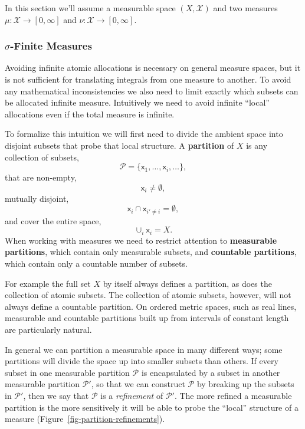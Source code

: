 \documentclass[
  letterpaper,
  DIV=11,
  numbers=noendperiod]{scrartcl}
\begin{document}
In this section we'll assume a measurable space \((X, \mathcal{X})\) and
two measures \(\mu : \mathcal{X} \rightarrow [0, \infty]\) and
\(\nu : \mathcal{X} \rightarrow [0, \infty]\).

\hypertarget{sigma-finite-measures}{%
\subsubsection{\texorpdfstring{{\(\sigma\)}-Finite
Measures}{\textbackslash sigma-Finite Measures}}\label{sigma-finite-measures}}

Avoiding infinite atomic allocations is necessary on general measure
spaces, but it is not sufficient for translating integrals from one
measure to another. To avoid any mathematical inconsistencies we also
need to limit exactly which subsets can be allocated infinite measure.
Intuitively we need to avoid infinite ``local'' allocations even if the
total measure is infinite.

To formalize this intuition we will first need to divide the ambient
space into disjoint subsets that probe that local structure. A
\textbf{partition} of \(X\) is any collection of subsets, \[
\mathcal{P}
= \{ \mathsf{x}_{1}, \ldots, \mathsf{x}_{i}, \ldots \},
\] that are non-empty, \[
\mathsf{x}_{i} \ne \emptyset,
\] mutually disjoint, \[
\mathsf{x}_{i} \cap \mathsf{x}_{i' \ne i} = \emptyset,
\] and cover the entire space, \[
\cup_{i} \mathsf{x}_{i} = X.
\] When working with measures we need to restrict attention to
\textbf{measurable partitions}, which contain only measurable subsets,
and \textbf{countable partitions}, which contain only a countable number
of subsets.

For example the full set \(X\) by itself always defines a partition, as
does the collection of atomic subsets. The collection of atomic subsets,
however, will not always define a countable partition. On ordered metric
spaces, such as real lines, measurable and countable partitions built up
from intervals of constant length are particularly natural.

In general we can partition a measurable space in many different ways;
some partitions will divide the space up into smaller subsets than
others. If every subset in one measurable partition \(\mathcal{P}\) is
encapsulated by a subset in another measurable partition
\(\mathcal{P}'\), so that we can construct \(\mathcal{P}\) by breaking
up the subsets in \(\mathcal{P}'\), then we say that \(\mathcal{P}\) is
a \emph{refinement} of \(\mathcal{P}'\). The more refined a measurable
partition is the more sensitively it will be able to probe the ``local''
structure of a measure (Figure~\ref{fig-partition-refinements}).
\end{document}
